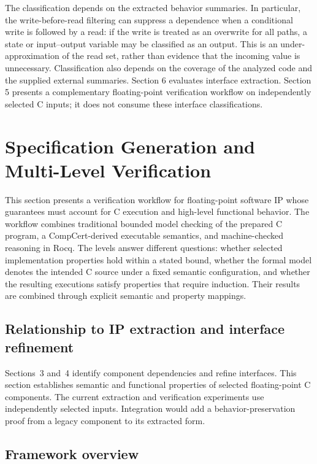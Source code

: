 \documentclass[manuscript, screen, review]{acmart}
\begin{document}
The classification depends on the extracted behavior summaries. In particular, the write-before-read filtering can suppress a dependence when a conditional write is followed by a read: if the write is treated as an overwrite for all paths, a state or input–output variable may be classified as an output. This is an under-approximation of the read set, rather than evidence that the incoming value is unnecessary. Classification also depends on the coverage of the analyzed code and the supplied external summaries. Section 6 evaluates interface extraction. Section 5 presents a complementary floating-point verification workflow on independently selected C inputs; it does not consume these interface classifications.


\section{Specification Generation and Multi-Level Verification}
\label{sec:verification}

This section presents a verification workflow for floating-point software IP
whose guarantees must account for C execution and high-level functional behavior.
The workflow combines traditional bounded model checking of the prepared C
program, a CompCert-derived executable semantics, and machine-checked
reasoning in Rocq. The levels answer different questions: whether selected
implementation properties hold within a stated bound, whether the formal
model denotes the intended C source under a fixed semantic configuration,
and whether the resulting executions satisfy properties that require
induction. Their results are combined through explicit semantic and property mappings.

\subsection{Relationship to IP extraction and interface refinement}

Sections~3 and~4 identify component dependencies and refine interfaces.
This section establishes semantic and functional properties of selected
floating-point C components. The current extraction and verification
experiments use independently selected inputs. Integration would add a
behavior-preservation proof from a legacy component to its extracted form.

\subsection{Framework overview}
\end{document}
